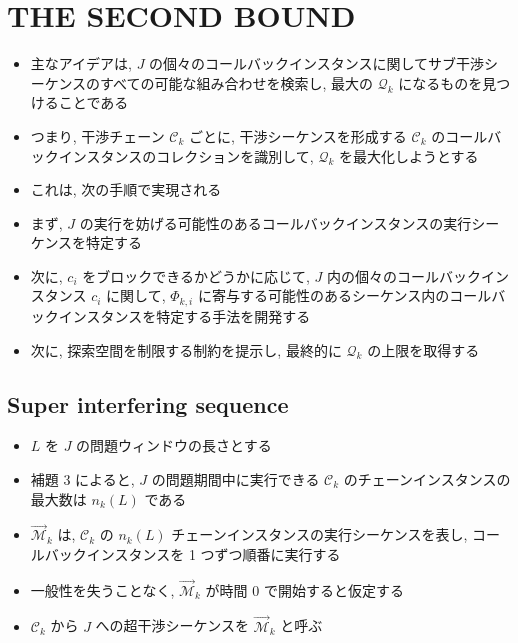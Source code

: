 
\section{THE SECOND BOUND}
\label{sec: the_second_bound}

\begin{frame}{}
    \begin{itemize}
        \item 主なアイデアは, $J$ の個々のコールバックインスタンスに関してサブ干渉シーケンスのすべての可能な組み合わせを検索し, 最大の $\mathcal{Q}_{k}$ になるものを見つけることである
        \item つまり, 干渉チェーン $\mathcal{C}_{k}$ ごとに, 干渉シーケンスを形成する $\mathcal{C}_{k}$ のコールバックインスタンスのコレクションを識別して, $\mathcal{Q}_{k}$ を最大化しようとする
    \end{itemize}
\end{frame}

\begin{frame}{}
    \begin{itemize}
        \item これは, 次の手順で実現される
        \item まず,  $J$ の実行を妨げる可能性のあるコールバックインスタンスの実行シーケンスを特定する
        \item 次に, $c_{i}$ をブロックできるかどうかに応じて, $J$ 内の個々のコールバックインスタンス $c_{i}$ に関して, $\Phi_{k, i}$ に寄与する可能性のあるシーケンス内のコールバックインスタンスを特定する手法を開発する
        \item 次に, 探索空間を制限する制約を提示し, 最終的に $\mathcal{Q}_{k}$ の上限を取得する
    \end{itemize}
\end{frame}

\subsection{Super interfering sequence}
\label{ssec: super_interfering_sequence}

\begin{frame}{}
    \begin{itemize}
        \item $L$ を $J$ の問題ウィンドウの長さとする
        \item 補題 3 によると,  $J$ の問題期間中に実行できる $\mathcal{C}_{k}$ のチェーンインスタンスの最大数は $n_{k}(L)$ である
        \item $\overrightarrow{\mathcal{M}}_{k}$ は, $\mathcal{C}_{k}$ の $n_{k}(L)$ チェーンインスタンスの実行シーケンスを表し, コールバックインスタンスを 1 つずつ順番に実行する
        \item 一般性を失うことなく,  $\overrightarrow{\mathcal{M}}_{k}$ が時間 0 で開始すると仮定する
        \item $\mathcal{C}_{k}$ から $J$ への超干渉シーケンスを $\overrightarrow{\mathcal{M}}_{k}$ と呼ぶ
    \end{itemize}
\end{frame}

